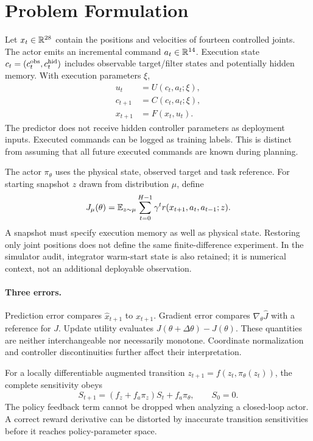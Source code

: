 \section{Problem Formulation}
Let $x_t\in\mathbb R^{28}$ contain the positions and velocities of fourteen controlled joints. The actor emits an incremental command $a_t\in\mathbb R^{14}$. Execution state $c_t=(c_t^{\rm obs},c_t^{\rm hid})$ includes observable target/filter states and potentially hidden memory. With execution parameters $\xi$,
\begin{align}
 u_t&=U(c_t,a_t;\xi),\\
 c_{t+1}&=C(c_t,a_t;\xi),\\
 x_{t+1}&=F(x_t,u_t).
\end{align}
The predictor does not receive hidden controller parameters as deployment inputs. Executed commands can be logged as training labels. This is distinct from assuming that all future executed commands are known during planning.

The actor $\pi_\theta$ uses the physical state, observed target and task reference. For starting snapshot $z$ drawn from distribution $\mu$, define
\begin{equation}
 J_\mu(\theta)=\mathbb E_{z\sim\mu}\sum_{t=0}^{H-1}\gamma^t r(x_{t+1},a_t,a_{t-1};z).
\end{equation}
A snapshot must specify execution memory as well as physical state. Restoring only joint positions does not define the same finite-difference experiment. In the simulator audit, integrator warm-start state is also retained; it is numerical context, not an additional deployable observation.

\paragraph{Three errors.}
Prediction error compares $\hat x_{t+1}$ to $x_{t+1}$. Gradient error compares $\nabla_\theta\hat J$ with a reference for $J$. Update utility evaluates $J(\theta+\Delta\theta)-J(\theta)$. These quantities are neither interchangeable nor necessarily monotone. Coordinate normalization and controller discontinuities further affect their interpretation.

For a locally differentiable augmented transition $z_{t+1}=f(z_t,\pi_\theta(z_t))$, the complete sensitivity obeys
\begin{equation}
 S_{t+1}=(f_z+f_a\pi_z)S_t+f_a\pi_\theta,
 \qquad S_0=0.
\end{equation}
The policy feedback term cannot be dropped when analyzing a closed-loop actor. A correct reward derivative can be distorted by inaccurate transition sensitivities before it reaches policy-parameter space.


